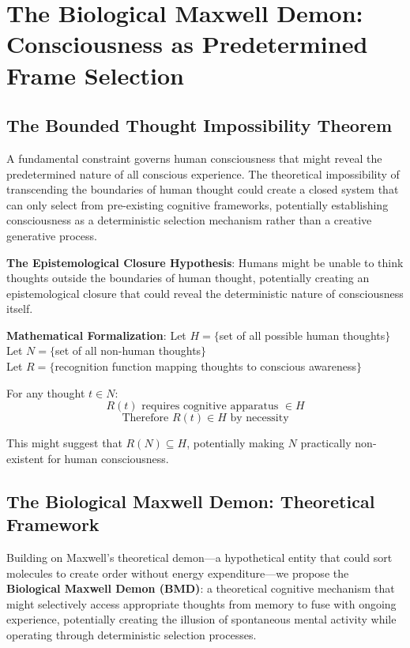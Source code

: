 \documentclass[12pt]{article}
\begin{document}
\section{The Biological Maxwell Demon: Consciousness as Predetermined Frame Selection}

\subsection{The Bounded Thought Impossibility Theorem}

A fundamental constraint governs human consciousness that might reveal the predetermined nature of all conscious experience. The theoretical impossibility of transcending the boundaries of human thought could create a closed system that can only select from pre-existing cognitive frameworks, potentially establishing consciousness as a deterministic selection mechanism rather than a creative generative process.

\textbf{The Epistemological Closure Hypothesis}: Humans might be unable to think thoughts outside the boundaries of human thought, potentially creating an epistemological closure that could reveal the deterministic nature of consciousness itself.

\textbf{Mathematical Formalization}:
Let $H = \{$set of all possible human thoughts$\}$ \\
Let $N = \{$set of all non-human thoughts$\}$ \\
Let $R = \{$recognition function mapping thoughts to conscious awareness$\}$

For any thought $t \in N$:
$$R(t) \text{ requires cognitive apparatus } \in H$$
$$\text{Therefore } R(t) \in H \text{ by necessity}$$

This might suggest that $R(N) \subseteq H$, potentially making $N$ practically non-existent for human consciousness.

\subsection{The Biological Maxwell Demon: Theoretical Framework}

Building on Maxwell's theoretical demon—a hypothetical entity that could sort molecules to create order without energy expenditure—we propose the \textbf{Biological Maxwell Demon (BMD)}: a theoretical cognitive mechanism that might selectively access appropriate thoughts from memory to fuse with ongoing experience, potentially creating the illusion of spontaneous mental activity while operating through deterministic selection processes.
\end{document}
